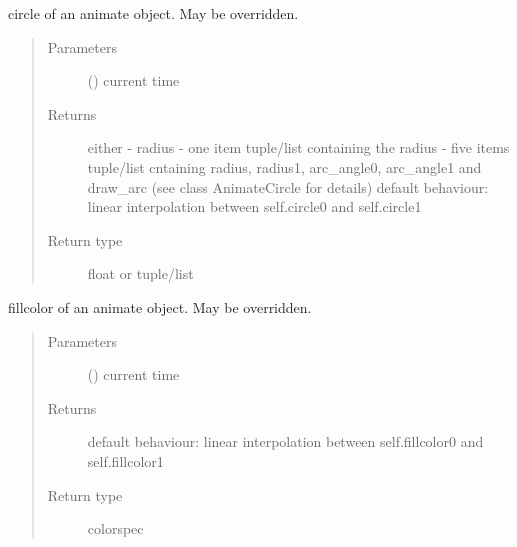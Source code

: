 \documentclass[letterpaper,10pt,english]{sphinxmanual}
\begin{document}
\begin{fulllineitems}
\begin{fulllineitems}
\label{\detokenize{Reference:salabim.Animate.circle}}
circle of an animate object. May be overridden.
\begin{quote}\begin{description}
\item[{Parameters}] \leavevmode
{} () \textendash{} current time

\item[{Returns}] \leavevmode
{} \textendash{} either 
- radius 
- one item tuple/list containing the radius 
- five items tuple/list cntaining radius, radius1, arc\_angle0, arc\_angle1 and draw\_arc 
(see class AnimateCircle for details) 
default behaviour: linear interpolation between self.circle0 and self.circle1

\item[{Return type}] \leavevmode
float or tuple/list

\end{description}\end{quote}

\end{fulllineitems}


\begin{fulllineitems}
\label{\detokenize{Reference:salabim.Animate.fillcolor}}
fillcolor of an animate object. May be overridden.
\begin{quote}\begin{description}
\item[{Parameters}] \leavevmode
{} () \textendash{} current time

\item[{Returns}] \leavevmode
{} \textendash{} default behaviour: linear interpolation between self.fillcolor0 and self.fillcolor1

\item[{Return type}] \leavevmode
colorspec

\end{description}\end{quote}


\end{fulllineitems}
\end{fulllineitems}
\end{document}
